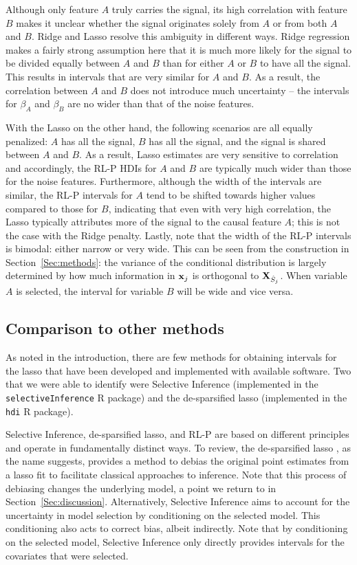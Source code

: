 Although only feature $A$ truly carries the signal, its high correlation with feature $B$ makes it unclear whether the signal originates solely from $A$ or from both $A$ and $B$. Ridge and Lasso resolve this ambiguity in different ways. Ridge regression makes a fairly strong assumption here that it is much more likely for the signal to be divided equally between $A$ and $B$ than for either $A$ or $B$ to have all the signal. This results in intervals that are very similar for $A$ and $B$. As a result, the correlation between $A$ and $B$ does not introduce much uncertainty -- the intervals for $\beta_A$ and $\beta_B$ are no wider than that of the noise features.

With the Lasso on the other hand, the following scenarios are all equally penalized: $A$ has all the signal, $B$ has all the signal, and the signal is shared between $A$ and $B$. As a result, Lasso estimates are very sensitive to correlation and accordingly, the RL-P HDIs for $A$ and $B$ are typically much wider than those for the noise features. Furthermore, although the width of the intervals are similar, the RL-P intervals for $A$ tend to be shifted towards higher values compared to those for $B$, indicating that even with very high correlation, the Lasso typically attributes more of the signal to the causal feature $A$; this is not the case with the Ridge penalty. Lastly, note that the width of the RL-P intervals is bimodal: either narrow or very wide. This can be seen from the construction in Section~\ref{Sec:methods}: the variance of the conditional distribution is largely determined by how much information in $\mathbf{x}_j$ is orthogonal to $\mathbf{X}_{\hat{S}_j}$. When variable $A$ is selected, the interval for variable $B$ will be wide and vice versa.

\subsection{Comparison to other methods} \label{Sec:Comparison}

As noted in the introduction, there are few methods for obtaining intervals for the lasso that have been developed and implemented with available software. Two that we were able to identify were Selective Inference (implemented in the \texttt{selectiveInference} R package) and the de-sparsified lasso (implemented in the \texttt{hdi} R package).

Selective Inference, de-sparsified lasso, and RL-P are based on different principles and operate in fundamentally distinct ways. To review, the de-sparsified lasso \citep{ZhangZhang2014}, as the name suggests, provides a method to debias the original point estimates from a lasso fit to facilitate classical approaches to inference. Note that this process of debiasing changes the underlying model, a point we return to in Section~\ref{Sec:discussion}. Alternatively, Selective Inference \citep{Lee2016,Tibshirani2016} aims to account for the uncertainty in model selection by conditioning on the selected model. This conditioning also acts to correct bias, albeit indirectly. Note that by conditioning on the selected model, Selective Inference only directly provides intervals for the covariates that were selected.

